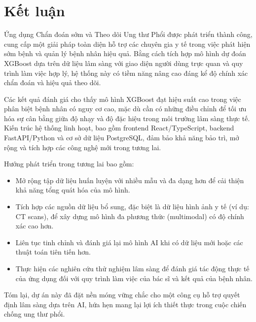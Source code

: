 \section{Kết luận}

Ứng dụng Chẩn đoán sớm và Theo dõi Ung thư Phổi được phát triển thành công, cung cấp một giải pháp toàn diện hỗ trợ các chuyên gia y tế trong việc phát hiện sớm bệnh và quản lý bệnh nhân hiệu quả. Bằng cách tích hợp mô hình dự đoán XGBoost dựa trên dữ liệu lâm sàng với giao diện người dùng trực quan và quy trình làm việc hợp lý, hệ thống này có tiềm năng nâng cao đáng kể độ chính xác chẩn đoán và hiệu quả theo dõi.

Các kết quả đánh giá cho thấy mô hình XGBoost đạt hiệu suất cao trong việc phân biệt bệnh nhân có nguy cơ cao, mặc dù cần có những điều chỉnh để tối ưu hóa sự cân bằng giữa độ nhạy và độ đặc hiệu trong môi trường lâm sàng thực tế. Kiến trúc hệ thống linh hoạt, bao gồm frontend React/TypeScript, backend FastAPI/Python và cơ sở dữ liệu PostgreSQL, đảm bảo khả năng bảo trì, mở rộng và tích hợp các công nghệ mới trong tương lai.

Hướng phát triển trong tương lai bao gồm:
\begin{itemize}
    \item Mở rộng tập dữ liệu huấn luyện với nhiều mẫu và đa dạng hơn để cải thiện khả năng tổng quát hóa của mô hình.
    \item Tích hợp các nguồn dữ liệu bổ sung, đặc biệt là dữ liệu hình ảnh y tế (ví dụ: CT scans), để xây dựng mô hình đa phương thức (multimodal) có độ chính xác cao hơn.
    \item Liên tục tinh chỉnh và đánh giá lại mô hình AI khi có dữ liệu mới hoặc các thuật toán tiên tiến hơn.
    \item Thực hiện các nghiên cứu thử nghiệm lâm sàng để đánh giá tác động thực tế của ứng dụng đối với quy trình làm việc của bác sĩ và kết quả của bệnh nhân.
\end{itemize}

Tóm lại, dự án này đã đặt nền móng vững chắc cho một công cụ hỗ trợ quyết định lâm sàng dựa trên AI, hứa hẹn mang lại lợi ích thiết thực trong cuộc chiến chống ung thư phổi.
